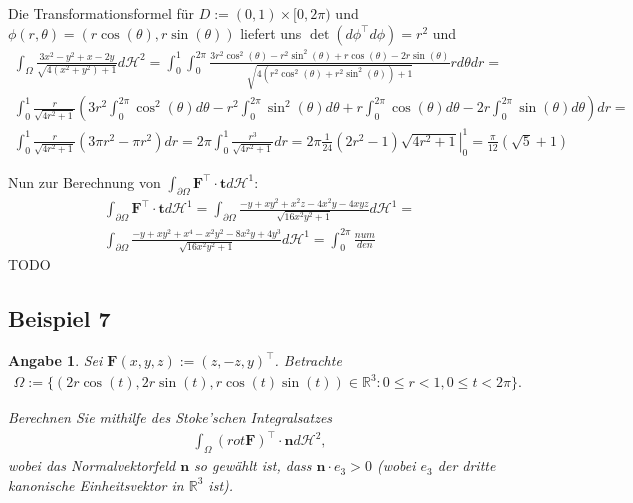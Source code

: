 \documentclass[]{article}
\newtheorem*{angabe*}{Angabe}
\begin{document}
Die Transformationsformel für $D:=(0,1)\times[0,2\pi)$ und $\phi(r, \theta) = (r\cos(\theta), r\sin(\theta))$ liefert uns $\det(d\phi^\top d\phi) = r^2$ und
\begin{align*}
	\int_\Omega \frac{3x^2 - y^2 + x - 2y}{\sqrt{4(x^2+y^2)+1}} d\mathcal{H}^2 = \int_{0}^{1} \int_{0}^{2\pi} \frac{3r^2\cos^2(\theta) - r^2\sin^2(\theta) + r\cos(\theta) - 2r\sin(\theta)}{\sqrt{4(r^2\cos^2(\theta)+r^2\sin^2(\theta))+1}} r d\theta dr =\\
	\int_{0}^{1} \frac{r}{\sqrt{4r^2 + 1}} \left(3r^2\int_{0}^{2\pi} \cos^2(\theta) d\theta - r^2\int_{0}^{2\pi} \sin^2(\theta) d\theta + r\int_{0}^{2\pi} \cos(\theta) d\theta - 2r\int_{0}^{2\pi} \sin(\theta) d\theta \right) dr = \\
	\int_{0}^{1} \frac{r}{\sqrt{4r^2 + 1}} (3\pi r^2 - \pi r^2) dr = 2\pi \int_{0}^{1} \frac{r^3}{\sqrt{4r^2+1}} dr = 2\pi \left. \frac{1}{24} (2r^2-1)\sqrt{4r^2 + 1}\right\vert_0^1 =  \frac{\pi}{12} (\sqrt{5} + 1)
\end{align*}

Nun zur Berechnung von $\int_{\partial\Omega} \bm{F}^\top \cdot \bm{t} d\mathcal{H}^1$:
\begin{align*}
	\int_{\partial\Omega} \bm{F}^\top \cdot \bm{t} d\mathcal{H}^1 = \int_{\partial\Omega} \frac{-y + xy^2 + x^2z - 4x^2y - 4xyz}{\sqrt{16x^2y^2+1}} d\mathcal{H}^1 =\\
	\int_{\partial\Omega} \frac{-y+xy^2+x^4-x^2y^2-8x^2y+4y^3}{\sqrt{16x^2y^2+1}} d\mathcal{H}^1 = \int_0^{2\pi} \frac{num}{den}
\end{align*}
TODO
\newpage
 
\subsection*{Beispiel 7}
\begin{angabe*}
	Sei $\bm{F}(x,y,z):=(z, -z, y)^\top$. Betrachte
	\begin{align*}
		\Omega := \{(2r\cos(t), 2r\sin(t), r\cos(t)\sin(t))\in \mathbb{R}^3: 0 \leq r < 1, 0 \leq t < 2\pi\}.
	\end{align*}
	
	Berechnen Sie mithilfe des Stoke'schen Integralsatzes
	\begin{align*}
		\int_\Omega (rot \bm{F})^\top \cdot \bm{n} d\mathcal{H}^2,
	\end{align*}
	wobei das Normalvektorfeld $\bm{n}$ so gewählt ist, dass $\bm{n}\cdot e_3 > 0$ (wobei $e_3$ der dritte kanonische Einheitsvektor in $\mathbb{R}^3$ ist).
\end{angabe*}
\end{document}
